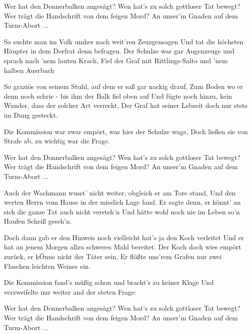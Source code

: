     \beginchorus
        Wer hat den Donnerbalken anges\"{a}gt?
        Wen hat's zu solch gottloser Tat bewegt?
        Wer tr\"{a}gt die Handschrift von dem feigen Mord?
        An unser'm Gnaden auf dem Turm-Abort ...
    \endchorus

    \beginverse
        So suchte man im Volk umher nach weit'ren Zeuzgensagen
        Und tat die h\"{o}chsten H\"{a}upter in dem Dorfrat denn befragen.
        Der Schulze war gar Augenzeuge und sprach nach 'nem lauten Krach,
        Fiel der Graf mit Rittlings-Salto und 'nem halben Auerbach

        So grazi\"{o}s von seinem Stuhl, auf dem er sa\ss{} gar nackig drauf,
        Zum Boden wo er denn noch schrie - bis ihm der Balk fiel oben auf
        Und f\"{u}gte noch hinzu, kein Wunder, dass der solcher Art verreckt,
        Der Graf hat seiner Lebzeit doch nur stets im Dung gesteckt.
    \endverse

    \beginverse*
        Die Kommission war zwar emp\"{o}rt, was hier der Schulze wage,
        Doch lie\ss{}en sie von Strafe ab, zu wichtig war die Frage.
    \endverse

    \beginchorus
        Wer hat den Donnerbalken anges\"{a}gt?
        Wen hat's zu solch gottloser Tat bewegt?
        Wer tr\"{a}gt die Handschrift von dem feigen Mord?
        An unser'm Gnaden auf dem Turm-Abort ...
    \endchorus

    \beginverse
        Auch der Wachmann wusst' nicht weiter, obgleich er am Tore stand,
        Und den werten Herrn vom Hause in der misslich Lage fand.
        Er sagte denn, er k\"{o}nnt' an sich die ganze Tat auch nicht versteh'n
            Und h\"{a}tte wohl noch nie im Leben so'n Haufen Schei\ss{} geseh'n.

        Doch dann gab er den Hinweis noch vielleicht hat's ja den Koch verleitet
        Und er hat an jenem Morgen allzu schweres Mahl bereitet.
        Der Koch doch wies emp\"{o}rt zur\"{u}ck, er k\"{O}nne nicht der T\"{a}ter sein,
        Er fl\"{o}\ss{}te uns'rem Grafen nur zwei Flaschen leichten Weines ein.
    \endverse

    \beginverse*
        Die Kommission fand's m\"{u}\ss{}ig schon und bracht's zu keiner Klage
        Und verzweifelte nur weiter and der steten Frage:
    \endverse

    \beginchorus
        Wer hat den Donnerbalken anges\"{a}gt?
        Wen hat's zu solch gottloser Tat bewegt?
        Wer tr\"{a}gt die Handschrift von dem feigen Mord?
        An unser'm Gnaden auf dem Turm-Abort ...
    \endchorus

